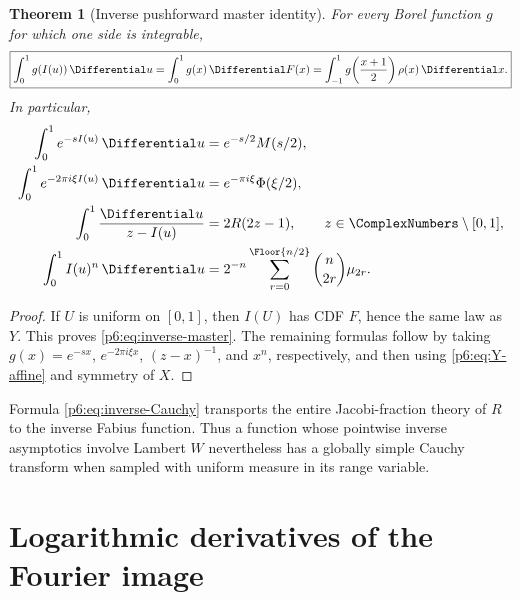 \documentclass[11pt]{article}
\newtheorem{theorem}{Theorem}[section]
\theoremstyle{definition}
\theoremstyle{remark}
\begin{document}
\begin{theorem}[Inverse pushforward master identity]\label{p6:thm:inverse-pushforward}
For every Borel function \(g\) for which one side is integrable,
\begin{equation}
 \boxed{
 \int_0^1g(I(u))\,\Differential u
 =\int_0^1g(x)\,\Differential F(x)
 =\int_{-1}^{1}g\!\left(\frac{x+1}{2}\right)\rho(x)\,\Differential x.
 }                                                           \label{p6:eq:inverse-master}
\end{equation}
In particular,
\begin{align}
 \int_0^1 e^{-sI(u)}\,\Differential u
 &=e^{-s/2}M(s/2),                                           \label{p6:eq:inverse-Laplace}\\
 \int_0^1 e^{-2\pi i\xi I(u)}\,\Differential u
 &=e^{-\pi i\xi}\Phi(\xi/2),                              \label{p6:eq:inverse-Fourier}\\
 \int_0^1\frac{\Differential u}{z-I(u)}
 &=2R(2z-1),\qquad z\in\ComplexNumbers\setminus[0,1],                   \label{p6:eq:inverse-Cauchy}\\
 \int_0^1I(u)^n\,\Differential u
 &=2^{-n}\sum_{r=0}^{\Floor{n/2}}
   \binom{n}{2r}\mu_{2r}.                                   \label{p6:eq:inverse-moments}
\end{align}
\end{theorem}

\begin{proof}
If \(U\) is uniform on \([0,1]\), then \(I(U)\) has CDF \(F\), hence the same law as
\(Y\).  This proves \eqref{p6:eq:inverse-master}.  The remaining formulas follow by taking
\(g(x)=e^{-sx}\), \(e^{-2\pi i\xi x}\), \((z-x)^{-1}\), and \(x^n\), respectively,
and then using \eqref{p6:eq:Y-affine} and symmetry of \(X\).
\end{proof}

\begin{remark}
Formula \eqref{p6:eq:inverse-Cauchy} transports the entire Jacobi-fraction theory of \(R\) to
the inverse Fabius function.  Thus a function whose pointwise inverse asymptotics involve
Lambert \(W\) nevertheless has a globally simple Cauchy transform when sampled with
uniform measure in its range variable.
\end{remark}

\section{Logarithmic derivatives of the Fourier image}
\end{document}
